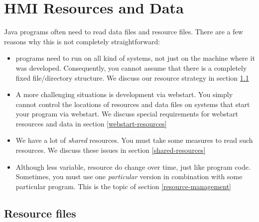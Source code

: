 \ifx \hmixmlreportdir \undefinedmacro {} \fi
\ifx \webserver \undefinedmacro \def \webserver{http://elckerlyc.sourceforge.net/javadoc/Hmi/} \fi

\chapter{HMI Resources and Data}
Java programs often need to read data files and resource files.
There are a few reasons why this is not completely straightforward:

\begin{itemize}
\item programs need to run on all kind of systems, not just on the machine where it was developed.
Consequently, you cannot assume that there is a completely fixed file/directory structure.
We discuss our resource strategy in section \ref{resource-files}
\item A more challenging situations is development via webstart. You simply cannot control
the locations of resources and data files on systems that start your program via webstart.
We discuss special requirements for webstart resources and data in section \ref{webstart-resources}
\item We have a lot of \emph{shared} resources. You must take some measures to read such resources.
We discuss these issues in section \ref{shared-resources}
\item Although less variable, resource do change over time, just like program code.
Sometimes, you must use one \emph{particular} version in combination with some particular program.
This is the topic of section \ref{resource-management}
\end{itemize}

\section{Resource files}
\label{resource-files}

